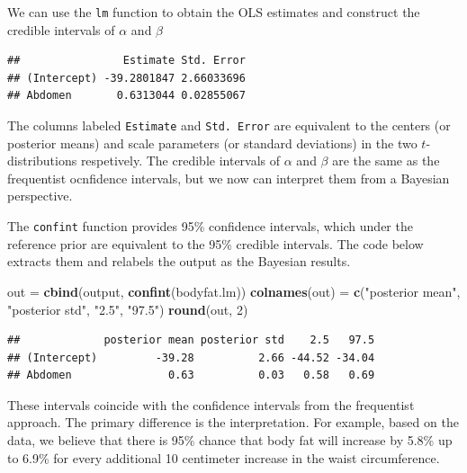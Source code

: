 \documentclass[]{book}
\newenvironment{Shaded}{\begin{snugshade}}{\end{snugshade}}
\newcommand{\KeywordTok}[1]{\textcolor[rgb]{0.13,0.29,0.53}{\textbf{{#1}}}}
\newcommand{\DecValTok}[1]{\textcolor[rgb]{0.00,0.00,0.81}{{#1}}}
\newcommand{\StringTok}[1]{\textcolor[rgb]{0.31,0.60,0.02}{{#1}}}
\newcommand{\NormalTok}[1]{{#1}}
\theoremstyle{definition}
\theoremstyle{definition}
\theoremstyle{definition}
\theoremstyle{remark}
\begin{document}
We can use the \texttt{lm} function to obtain the OLS estimates and
construct the credible intervals of \(\alpha\) and \(\beta\)

\begin{Shaded}
\end{Shaded}

\begin{verbatim}
##                Estimate Std. Error
## (Intercept) -39.2801847 2.66033696
## Abdomen       0.6313044 0.02855067
\end{verbatim}

The columns labeled \texttt{Estimate} and \texttt{Std.\ Error} are
equivalent to the centers (or posterior means) and scale parameters (or
standard deviations) in the two \(t\)-distributions respetively. The
credible intervals of \(\alpha\) and \(\beta\) are the same as the
frequentist ocnfidence intervals, but we now can interpret them from a
Bayesian perspective.

The \texttt{confint} function provides 95\% confidence intervals, which
under the reference prior are equivalent to the 95\% credible intervals.
The code below extracts them and relabels the output as the Bayesian
results.

\begin{Shaded}
\begin{Highlighting}[]
\NormalTok{out =}\StringTok{ }\KeywordTok{cbind}\NormalTok{(output, }\KeywordTok{confint}\NormalTok{(bodyfat.lm))}
\KeywordTok{colnames}\NormalTok{(out) =}\StringTok{ }\KeywordTok{c}\NormalTok{(}\StringTok{"posterior mean"}\NormalTok{, }\StringTok{"posterior std"}\NormalTok{, }\StringTok{"2.5"}\NormalTok{, }\StringTok{"97.5"}\NormalTok{)}
\KeywordTok{round}\NormalTok{(out, }\DecValTok{2}\NormalTok{)}
\end{Highlighting}
\end{Shaded}

\begin{verbatim}
##             posterior mean posterior std    2.5   97.5
## (Intercept)         -39.28          2.66 -44.52 -34.04
## Abdomen               0.63          0.03   0.58   0.69
\end{verbatim}

These intervals coincide with the confidence intervals from the
frequentist approach. The primary difference is the interpretation. For
example, based on the data, we believe that there is 95\% chance that
body fat will increase by 5.8\% up to 6.9\% for every additional 10
centimeter increase in the waist circumference.
\end{document}
